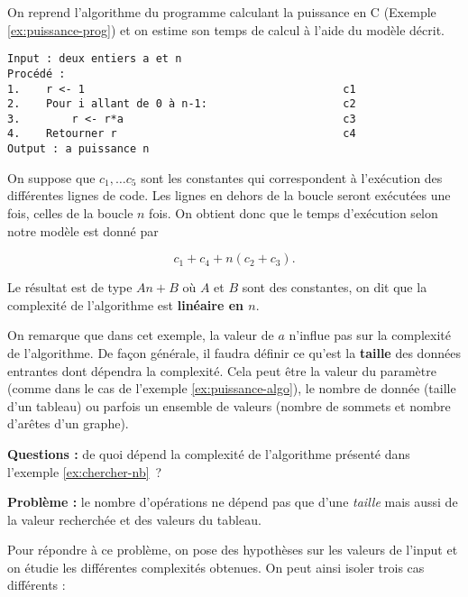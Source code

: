 \documentclass{../cours}
\begin{document}
\begin{Example}
\label{ex:puissance-algo}

On reprend l'algorithme du programme calculant la puissance en C (Exemple \ref{ex:puissance-prog}) et on estime son temps de calcul à l'aide du modèle décrit.

\begin{lstlisting}
Input : deux entiers a et n
Procédé :
1.    r <- 1                                        c1
2.    Pour i allant de 0 à n-1:                     c2
3.        r <- r*a                                  c3
4.    Retourner r                                   c4
Output : a puissance n
\end{lstlisting}

On suppose que $c_1, \dots c_5$ sont les constantes qui correspondent à l'exécution des différentes lignes de code. Les lignes en dehors de la boucle seront exécutées une fois, celles de la boucle $n$ fois. On obtient donc que le temps d'exécution selon notre modèle est donné par

\begin{equation}
c_1 + c_4 +n (c_2 +c_3).
\end{equation}

Le résultat est de type $An +B$ où $A$ et $B$ sont des constantes, on dit que la complexité de l'algorithme est \textbf{linéaire en $n$}.

\end{Example}

On remarque que dans cet exemple, la valeur de $a$ n'influe pas sur la complexité de l'algorithme. De façon générale, il faudra définir ce qu'est la \textbf{taille} des données entrantes dont dépendra la complexité. Cela peut être la valeur du paramètre (comme dans le cas de l'exemple \ref{ex:puissance-algo}), le nombre de donnée (taille d'un tableau) ou parfois un ensemble de valeurs (nombre de sommets et nombre d'arêtes d'un graphe). 

\textbf{Questions :} de quoi dépend la complexité de l'algorithme présenté dans l'exemple \ref{ex:chercher-nb}~?

\textbf{Problème : } le nombre d'opérations ne dépend pas que d'une \emph{taille} mais aussi de la valeur recherchée et des valeurs du tableau.

Pour répondre à ce problème, on pose des hypothèses sur les valeurs de l'input et on étudie les différentes complexités obtenues. On peut ainsi isoler trois cas différents :
\end{document}
